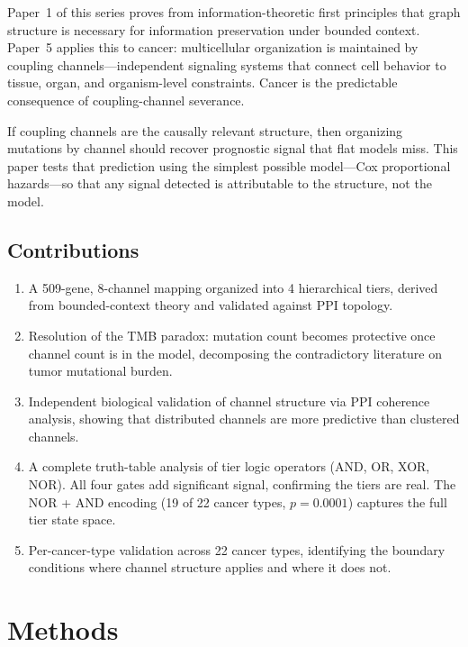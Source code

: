 \documentclass[11pt]{article}
\begin{document}
Paper~1 of this series \cite{McCarthy2026a} proves from
information-theoretic first principles that graph structure is
necessary for information preservation under bounded context.
Paper~5 \cite{McCarthy2026e} applies this to cancer:
multicellular organization is maintained by coupling
channels---independent signaling systems that connect cell
behavior to tissue, organ, and organism-level constraints. Cancer
is the predictable consequence of coupling-channel severance.

If coupling channels are the causally relevant structure, then
organizing mutations by channel should recover prognostic signal
that flat models miss. This paper tests that prediction using the
simplest possible model---Cox proportional hazards---so that any
signal detected is attributable to the structure, not the model.

\subsection{Contributions}

\begin{enumerate}
\item A 509-gene, 8-channel mapping organized into 4 hierarchical
   tiers, derived from bounded-context theory and validated against
   PPI topology.
\item Resolution of the TMB paradox: mutation count becomes
   protective once channel count is in the model, decomposing
   the contradictory literature on tumor mutational burden.
\item Independent biological validation of channel structure via
   PPI coherence analysis, showing that distributed channels are
   more predictive than clustered channels.
\item A complete truth-table analysis of tier logic operators
   (AND, OR, XOR, NOR). All four gates add significant signal,
   confirming the tiers are real. The NOR + AND encoding
   (19 of 22 cancer types, $p = 0.0001$) captures the full
   tier state space.
\item Per-cancer-type validation across 22 cancer types,
   identifying the boundary conditions where channel structure
   applies and where it does not.
\end{enumerate}

\section{Methods}
\label{sec:methods}
\end{document}

